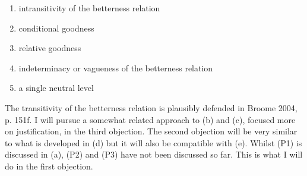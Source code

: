 \begin{enumerate} \item intransitivity of the betterness relation \item conditional goodness \item relative goodness \item indeterminacy or vagueness of the betterness relation \item a single neutral level \end{enumerate} The transitivity of the betterness relation is plausibly defended in \label{ref:RNDLa97xVELwW}Broome 2004, p. 151f. I will pursue a somewhat related approach to (b) and (c), focused more on justification, in the third objection. The second objection will be very similar to what is developed in (d) but it will also be compatible with (e). Whilst (P1) is discussed in (a), (P2) and (P3) have not been discussed so far. This is what I will do in the first objection.  